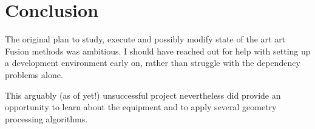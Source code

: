 \section{Conclusion}

The original plan to study, execute and possibly modify state of the art
art Fusion methods was ambitious.
I should have reached out for help with setting up a development environment
early on, rather than struggle with the dependency problems alone.

This arguably (as of yet!) unsuccessful project nevertheless did provide an opportunity to
learn about the equipment and to apply several geometry processing algorithms.

